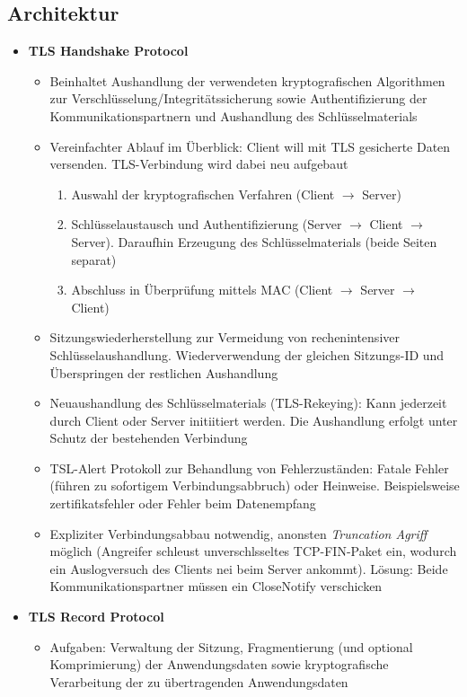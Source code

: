 \subsection{Architektur}
\begin{itemize}
	\item \textbf{TLS Handshake Protocol}
	\begin{itemize}
		\item Beinhaltet Aushandlung der verwendeten kryptografischen Algorithmen zur Verschlüsselung/Integritätssicherung sowie Authentifizierung der Kommunikationspartnern und Aushandlung des Schlüsselmaterials
		\item Vereinfachter Ablauf im Überblick: Client will mit TLS gesicherte Daten versenden. TLS-Verbindung wird dabei neu aufgebaut
		\begin{enumerate}
			\item Auswahl der kryptografischen Verfahren (Client \(\rightarrow\) Server)
			\item Schlüsselaustausch und Authentifizierung (Server \(\rightarrow\) Client \(\rightarrow\) Server). Daraufhin Erzeugung des Schlüsselmaterials (beide Seiten separat)
			\item Abschluss in Überprüfung mittels MAC (Client \(\rightarrow\) Server \(\rightarrow\) Client)
		\end{enumerate}
		\item Sitzungswiederherstellung zur Vermeidung von rechenintensiver Schlüsselaushandlung. Wiederverwendung der gleichen Sitzungs-ID und Überspringen der restlichen Aushandlung
		\item Neuaushandlung des Schlüsselmaterials (TLS-Rekeying): Kann jederzeit durch Client oder Server initiitiert werden. Die Aushandlung erfolgt unter Schutz der bestehenden Verbindung
		\item TSL-Alert Protokoll zur Behandlung von Fehlerzuständen: Fatale Fehler (führen zu sofortigem Verbindungsabbruch) oder Heinweise. Beispielsweise zertifikatsfehler oder Fehler beim Datenempfang
		\item Expliziter Verbindungsabbau notwendig, anonsten \textit{Truncation Agriff} möglich (Angreifer schleust unverschlsseltes TCP-FIN-Paket ein, wodurch ein Auslogversuch des Clients nei beim Server ankommt). Lösung: Beide Kommunikationspartner müssen ein CloseNotify verschicken
	\end{itemize}
	\item \textbf{TLS Record Protocol}
	\begin{itemize}
		\item Aufgaben: Verwaltung der Sitzung, Fragmentierung (und optional Komprimierung) der Anwendungsdaten sowie kryptografische Verarbeitung der zu übertragenden Anwendungsdaten

\end{itemize}
\end{itemize}

